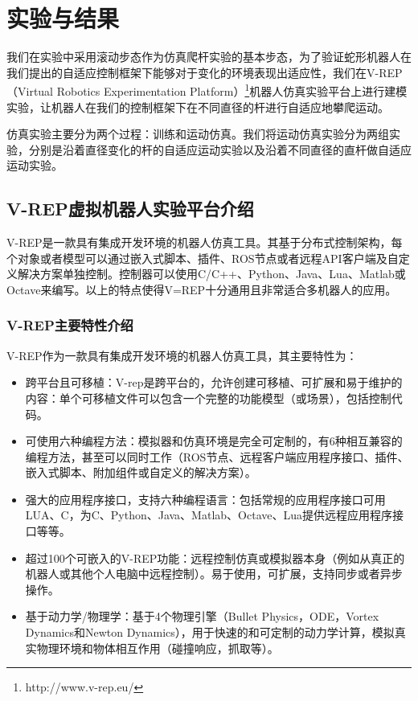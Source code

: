 \chapter{实验与结果}
\label{cha:experiment}
我们在实验中采用滚动步态作为仿真爬杆实验的基本步态，为了验证蛇形机器人在我们提出的自适应控制框架下能够对于变化的环境表现出适应性，我们在V-REP（Virtual Robotics Experimentation Platform）\footnote{http://www.v-rep.eu/}机器人仿真实验平台上进行建模实验，让机器人在我们的控制框架下在不同直径的杆进行自适应地攀爬运动。

仿真实验主要分为两个过程：训练和运动仿真。我们将运动仿真实验分为两组实验，分别是沿着直径变化的杆的自适应运动实验以及沿着不同直径的直杆做自适应运动实验。

\section{V-REP虚拟机器人实验平台介绍}

V-REP是一款具有集成开发环境的机器人仿真工具。其基于分布式控制架构，每个对象或者模型可以通过嵌入式脚本、插件、ROS节点或者远程API客户端及自定义解决方案单独控制。控制器可以使用C/C++、Python、Java、Lua、Matlab或Octave来编写。以上的特点使得V=REP十分通用且非常适合多机器人的应用。

\subsection{V-REP主要特性介绍}
V-REP作为一款具有集成开发环境的机器人仿真工具，其主要特性为：
\begin{itemize}
	\item 跨平台且可移植：V-rep是跨平台的，允许创建可移植、可扩展和易于维护的内容：单个可移植文件可以包含一个完整的功能模型（或场景），包括控制代码。 
	\item 可使用六种编程方法：模拟器和仿真环境是完全可定制的，有6种相互兼容的编程方法，甚至可以同时工作（ROS节点、远程客户端应用程序接口、插件、嵌入式脚本、附加组件或自定义的解决方案）。
	\item 强大的应用程序接口，支持六种编程语言：包括常规的应用程序接口可用LUA、C，为C、Python、Java、Matlab、Octave、Lua提供远程应用程序接口等等。
	\item 超过100个可嵌入的V-REP功能：远程控制仿真或模拟器本身（例如从真正的机器人或其他个人电脑中远程控制）。易于使用，可扩展，支持同步或者异步操作。
	\item 基于动力学/物理学：基于4个物理引擎（Bullet Physics，ODE，Vortex Dynamics和Newton Dynamics），用于快速的和可定制的动力学计算，模拟真实物理环境和物体相互作用（碰撞响应，抓取等）。
\end{itemize}

